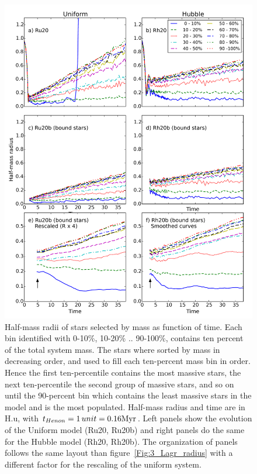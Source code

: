 \begin{figure}
\begin{center}
\includegraphics[width=\textwidth,clip=true]{Figures/3_Rhm_segr}
\caption{Half-mass radii of stars selected by mass as function of time. Each bin identified with 0-10\%, 10-20\% .. 90-100\%, contains ten percent of the total system mass. The stars where sorted by mass in decreasing order, and used to fill each ten-percent mass bin in order. Hence the first ten-percentile contains the most massive stars, the next ten-percentile the second group of massive stars, and so on until the 90-percent bin which contains the least massive stars in the model and is the most populated. Half-mass radius and time are in H.u, with $t_{Henon} = 1\,unit = 0.16 {\textrm{Myr}}$. Left panels show the evolution of the Uniform model (Ru20, Ru20b) and right panels do the same for the Hubble model (Rh20, Rh20b). The organization of panels follows the same layout than figure~\ref{Fig:3_Lagr_radius} with a different factor for the rescaling of the uniform system. }
\label{Fig:3_Rhm_segr}
\end{center}
\end{figure}

